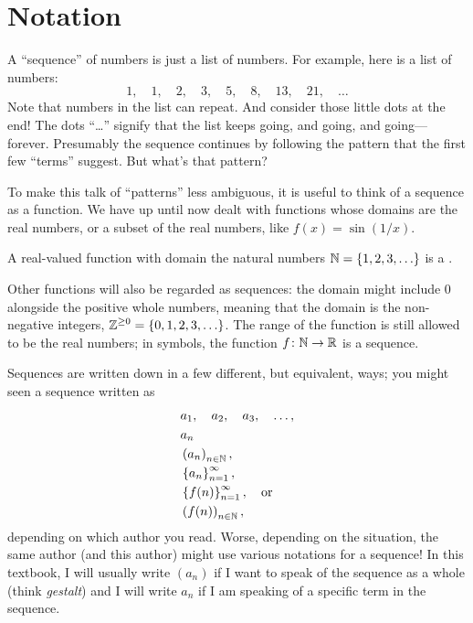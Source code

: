 
\section{Notation}


\nobreak A ``sequence'' of numbers is just a list of numbers.  For
example, here is a list of numbers:
$$
1,\quad 1,\quad 2,\quad 3,\quad 5,\quad 8,\quad 13,\quad 21,\quad \ldots
$$
Note that numbers in the list can repeat.  And consider those little
dots at the end!  The dots ``\ldots'' signify that the list keeps
going, and going, and going---forever.  Presumably the sequence
continues by following the pattern that the first few ``terms''
suggest.  But what's that pattern?

To make this talk of ``patterns'' less ambiguous, it is useful to
think of a sequence as a function. We have up until now dealt with
functions whose domains are the real numbers, or a subset of the real
numbers, like $f(x)=\sin (1/x)$.

A real-valued function with domain the natural numbers
$\mathbb{N}=\{1,2,3,\ldots\}$ is a .

Other functions will also be regarded as sequences: the domain might
include $0$ alongside the positive whole numbers, meaning that the
domain is the non-negative integers, $\displaystyle
\mathbb{Z}^{\ge0}=\{0,1,2,3,\ldots\}$.  The range of the function is still
allowed to be the real numbers; in symbols, the function $f\colon
\mathbb{N}\to\mathbb{R}$ is a sequence.


Sequences are written down in a few different, but equivalent,
ways; you might seen a sequence written as
\begin{align*}
  & a_1,\quad a_2, \quad a_3, \quad\ldots, \\
  & a_n \\
  & \left(a_n\right)_{n \in \mathbb{N}}, \\
  & \left\{a_n\right\}_{n=1}^\infty, \\
  & \left\{f(n)\right\}_{n=1}^\infty, \quad \mbox{or} \\
  & \left(f(n)\right)_{n \in \mathbb{N}},
\end{align*}
depending on which author you read.  Worse, depending on the
situation, the same author (and this author) might use various
notations for a sequence!  In this textbook, I will usually write
$(a_n)$ if I want to speak of the sequence as a whole (think
\textit{gestalt}) and I will write $a_n$ if I am speaking of a
specific term in the sequence.

